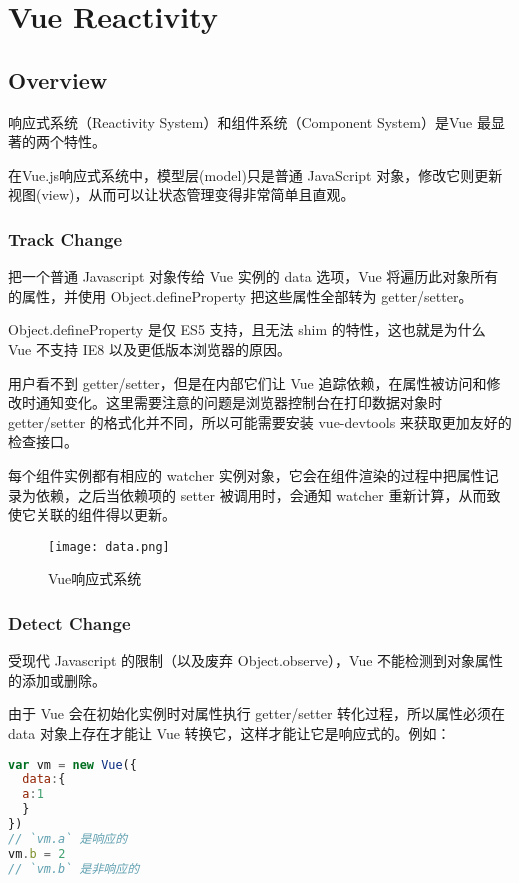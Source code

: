 \part{Vue Reactivity}


\chapter{Overview}


响应式系统（Reactivity System）和组件系统（Component System）是Vue 最显著的两个特性。

在Vue.js响应式系统中，模型层(model)只是普通 JavaScript 对象，修改它则更新视图(view)，从而可以让状态管理变得非常简单且直观。


\section{Track Change}

把一个普通 Javascript 对象传给 Vue 实例的 data 选项，Vue 将遍历此对象所有的属性，并使用 Object.defineProperty 把这些属性全部转为 getter/setter。

Object.defineProperty 是仅 ES5 支持，且无法 shim 的特性，这也就是为什么 Vue 不支持 IE8 以及更低版本浏览器的原因。


用户看不到 getter/setter，但是在内部它们让 Vue 追踪依赖，在属性被访问和修改时通知变化。这里需要注意的问题是浏览器控制台在打印数据对象时 getter/setter 的格式化并不同，所以可能需要安装 vue-devtools 来获取更加友好的检查接口。

每个组件实例都有相应的 watcher 实例对象，它会在组件渲染的过程中把属性记录为依赖，之后当依赖项的 setter 被调用时，会通知 watcher 重新计算，从而致使它关联的组件得以更新。

\begin{figure}[htbp]
\centering
\texttt{[image: data.png]}
\caption{Vue响应式系统}
\end{figure}


\section{Detect Change}

受现代 Javascript 的限制（以及废弃 Object.observe），Vue 不能检测到对象属性的添加或删除。

由于 Vue 会在初始化实例时对属性执行 getter/setter 转化过程，所以属性必须在 data 对象上存在才能让 Vue 转换它，这样才能让它是响应式的。例如：



\begin{lstlisting}[language=JavaScript]
var vm = new Vue({
  data:{
  a:1
  }
})
// `vm.a` 是响应的
vm.b = 2
// `vm.b` 是非响应的
\end{lstlisting}


